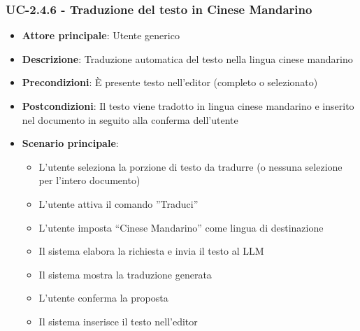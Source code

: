 \documentclass[11pt,a4paper]{article}
\begin{document}
\subsubsection{UC-2.4.6 - Traduzione del testo in Cinese Mandarino}
\begin{itemize}
    \item \textbf{Attore principale}: Utente generico
    \item \textbf{Descrizione}: Traduzione automatica del testo nella lingua cinese mandarino
    \item \textbf{Precondizioni}: È presente testo nell’editor (completo o selezionato)
    \item \textbf{Postcondizioni}: Il testo viene tradotto in lingua cinese mandarino e inserito nel documento in seguito alla conferma dell'utente
    \item \textbf{Scenario principale}:
    \begin{itemize}
        \item L’utente seleziona la porzione di testo da tradurre (o nessuna selezione per l'intero documento)
        \item L’utente attiva il comando ”Traduci”
        \item L’utente imposta “Cinese Mandarino” come lingua di destinazione
        \item Il sistema elabora la richiesta e invia il testo al LLM
        \item Il sistema mostra la traduzione generata
        \item L'utente conferma la proposta
        \item Il sistema inserisce il testo nell'editor
    \end{itemize}
\end{itemize}
\end{document}
